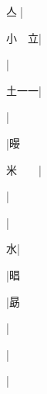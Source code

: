 \begin{multicols}{2}
{{\cjk{}{\cnsym{}　}亼{\cnjzr{}}}|{}\par
{\cjk{}小{\cnsym{}　}立}|{}\par
{}|{}\par
{\cjk{}土一一}|{}\par
{\cjk{}{\cnsym{}　}{\cnsym{}　}{\cnsym{}　}}|{}\par
{\cjk{}{\cnsym{}　}{\cnsym{}　}{\cnsym{}　}}|{\cjk{}暥}\par
{\cjk{}米{\cnsym{}　}{\cnsym{}　}}|{}\par
{\cjk{}{\cnsym{}　}{\cnsym{}　}{\cnsym{}　}}|{}\par
{\cjk{}{\cnsym{}　}{\cnsym{}　}{\cnsym{}　}}|{}\par
{\cjk{}{\cnsym{}　}{\cnsym{}　}水}|{}\par
{\cjk{}{\cnsym{}　}{\cnsym{}　}{\cnsym{}　}}|{\cjk{}晿}\par
{\cjk{}{\cnsym{}　}{\cnsym{}　}{\cnsym{}　}}|{\cjk{}勗}\par
{\cjk{}{\cnsym{}　}{\cnsym{}　}{\cnsym{}　}}|{}\par
{}|{}\par
{\cjk{}{\cnsym{}　}{\cnsym{}　}{\cnsym{}　}}|{}\par
}
\end{multicols}

